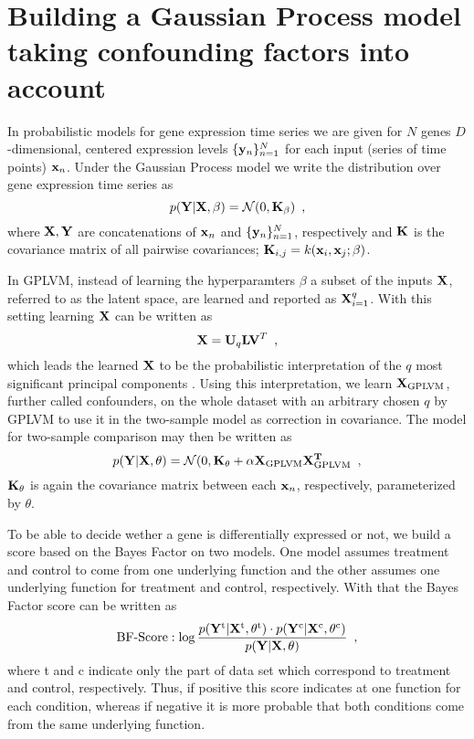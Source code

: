\documentclass[11pt,a4paper,titlepage,twoside,tablecaptionabove]{article}
\begin{document}
\section{Building a Gaussian Process model taking confounding factors
  into account}
\label{sec:build-gauss-proc}

In probabilistic models for gene expression time series we are given
for $N$ genes $D$-dimensional, centered expression levels $\{{\bf
  y}_n\}_{n=1}^N$ for each input (series of time points) ${\bf
  x}_n$. Under the Gaussian Process model \cite{rasmussen2004gaussian}
we write the distribution over gene expression time series as
\begin{equation}
  \label{eq:1}
  p({\bf Y}|{\bf X},\beta) = \mathcal N(0, {\bf K_\beta})\enspace,
\end{equation}
where ${\bf X,Y}$ are concatenations of ${\bf x}_n$ and $\{{\bf
  y}_n\}_{n=1}^N$, respectively and ${\bf K}$ is the covariance matrix
of all pairwise covariances; ${\bf K}_{i,j} = k({\bf x}_i, {\bf
  x}_j;\beta)$.

In GPLVM, instead of learning the hyperparamters $\beta$ a subset of
the inputs ${\bf X}$, referred to as the latent space, are learned and
reported as ${\bf X}_{i=1}^q$. With this setting learning $\bf X$ can
be written as
\begin{equation}
  \label{eq:2}
  {\bf X} = {\bf U}_q{\bf LV}^T\enspace,
\end{equation}
which leads the learned ${\bf X}$ to be the probabilistic
interpretation of the $q$ most significant principal components
\cite{lawrence2004gaussian}. Using this interpretation, we learn ${\bf
  X}_{\text{GPLVM}}$, further called confounders, on the whole dataset
with an arbitrary chosen $q$ by GPLVM to use it in the two-sample
model as correction in covariance. The model for two-sample comparison
may then be written as
\begin{equation}
  \label{eq:3}
  p({\bf Y}|{\bf X},\theta) = \mathcal N(0, {\bf K_\theta} +
  \alpha {\bf X_\text{GPLVM}}\bf X_\text{GPLVM}^T\enspace, 
\end{equation}
${\bf K}_\theta$ is again the covariance matrix between each ${\bf
  x}_n$, respectively, parameterized by $\theta$.

To be able to decide wether a gene is differentially expressed or not,
we build a score based on the Bayes Factor on two models. One model
assumes treatment and control to come from one underlying function and
the other assumes one underlying function for treatment and control,
respectively. With that the Bayes Factor score can be written as
\begin{equation}
  \label{eq:4}
  \text{BF-Score}: \log\frac{p({\bf Y}^\text{t}|{\bf
      X}^\text{t},\theta^\text{t})\cdot p({\bf Y}^\text{c}|{\bf X}^\text{c},\theta^\text{c})}{p({\bf Y}|{\bf X},\theta)}\enspace,
\end{equation}
where t and c indicate only the part of data set which correspond to
treatment and control, respectively. Thus, if positive this score
indicates at one function for each condition, whereas if negative it
is more probable that both conditions come from the same underlying
function.
\end{document}
